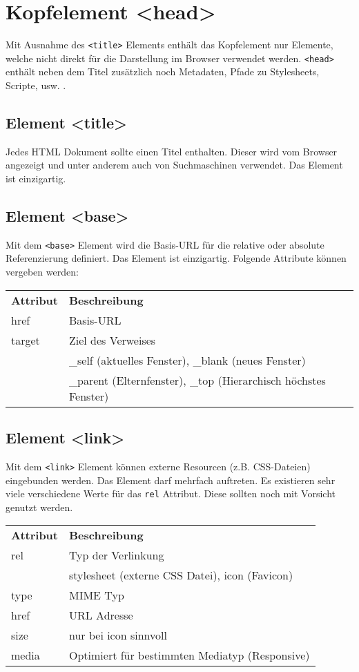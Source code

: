 \chapter{Kopfelement <head>} 
Mit Ausnahme des \texttt{<title>} Elements enthält das Kopfelement nur Elemente, welche nicht direkt für die Darstellung im Browser verwendet werden. \texttt{<head>} enthält neben dem Titel zusätzlich noch  Metadaten, Pfade zu Stylesheets, Scripte, usw. .
\section{Element <title>}
Jedes HTML Dokument sollte einen Titel enthalten. Dieser wird vom Browser angezeigt und unter anderem auch von Suchmaschinen verwendet. Das Element ist einzigartig.
\section{Element <base>}
Mit dem \texttt{<base>} Element wird die Basis-URL für die relative oder absolute Referenzierung definiert. Das Element ist einzigartig. Folgende Attribute können vergeben werden:\\[1em]
\begin{tabular}{p{3cm} l}
\textbf{Attribut}	&\textbf{Beschreibung}\\
href 			&Basis-URL\\
target		&Ziel des Verweises\\
			&\_self (aktuelles Fenster), \_blank (neues Fenster)\\
			&\_parent (Elternfenster), \_top (Hierarchisch höchstes Fenster)
\end{tabular}
\section{Element <link>}
Mit dem \texttt{<link>} Element können externe Resourcen (z.B. CSS-Dateien) eingebunden werden. Das Element darf mehrfach auftreten. Es existieren sehr viele verschiedene Werte für das \texttt{rel} Attribut. Diese sollten noch mit Vorsicht genutzt werden.\\[1em]
\begin{tabular}{p{4cm} l}
\textbf{Attribut}	&\textbf{Beschreibung}\\
rel 			&Typ der Verlinkung\\
			&stylesheet (externe CSS Datei), icon (Favicon)\\
type			&MIME Typ\\
href 		 	&URL Adresse\\
size			&nur bei icon sinnvoll\\
media		&Optimiert für bestimmten Mediatyp (Responsive)\\
\end{tabular}
\newpage
